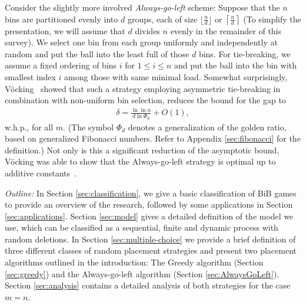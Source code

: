 \documentclass[a4paper,12pt]{article}
\begin{document}
Consider the slightly more involved \emph{Always-go-left} scheme: Suppose that the $n$ bins are partitioned evenly into $d$ groups, each of size $\lfloor \frac{n}{d}\rfloor$ or $\left\lceil\frac{n}{d}\right\rceil$ (To simplify the presentation, we will assume that $d$ divides $n$ evenly in the remainder of this survey). We select one bin from each group uniformly and independently at random and put the ball into the least full of those $d$ bins. For tie-breaking, we assume a fixed ordering of bins $i$ for $1 \leq i \leq n$ and put the ball into the bin with smallest index $i$ among those with same minimal load. Somewhat surprisingly, V\"ocking~\cite{VOC03} showed that such a strategy employing asymmetric tie-breaking in combination with non-uniform bin selection, reduces the bound for the gap to\
\begin{align*}
\delta = \frac{\ln\ln n}{d  \ln \Phi_d} + O(1),
\end{align*}
w.h.p., for all $m$. (The symbol $\Phi_d$ denotes a generalization of the golden ratio, based on generalized Fibonacci numbers. Refer to Appendix \ref{sec:fibonacci} for the definition.) Not only is this a significant reduction of the asymptotic bound, V\"ocking was able to show that the Always-go-left strategy is optimal up to additive constants~\cite{VOC03}.

\emph{Outline:}
In Section \ref{sec:classification}, we give a basic classification of BiB games to provide an overview of the research, followed by some applications in Section \ref{sec:applications}. Section \ref{sec:model} gives a detailed definition of the model we use, which can be classified as a sequential, finite and dynamic process with random deletions. In Section \ref{sec:multiple-choice} we provide a brief definition of three different classes of random placement strategies and present two placement algorithms outlined in the introduction: The Greedy algorithm (Section \ref{sec:greedy}) and the Always-go-left algorithm (Section \ref{sec:AlwaysGoLeft}). Section \ref{sec:analysis} contains a detailed analysis of both strategies for the case $m=n$. 
\end{document}
